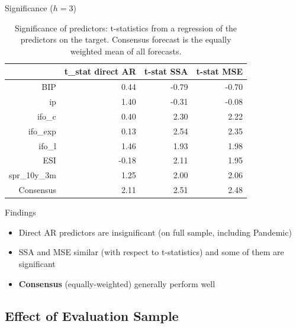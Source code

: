 \documentclass{beamer}
\begin{document}
\begin{frame} {Significance ($h=3$)}\label{tstat1}


\begin{table}[ht]
\centering
\begin{tabular}{rrrr}
  \hline
 & t\_stat direct AR & t-stat SSA & t-stat MSE \\ 
  \hline
BIP & 0.44 & -0.79 & -0.70 \\ 
  ip & 1.40 & -0.31 & -0.08 \\ 
  ifo\_c & 0.40 & 2.30 & 2.22 \\ 
  ifo\_exp & 0.13 & 2.54 & 2.35 \\ 
  ifo\_l & 1.46 & 1.93 & 1.98 \\ 
  ESI & -0.18 & 2.11 & 1.95 \\ 
  spr\_10y\_3m & 1.25 & 2.00 & 2.06 \\ 
  Consensus & 2.11 & 2.51 & 2.48 \\ 
   \hline
\end{tabular}
\caption{Significance of predictors: t-statistics from a regression of the predictors on the target. Consensus forecast is the equally weighted mean of all forecasts.} 
\label{perf_var1}
\end{table}\end{frame}


\begin{frame} {Findings}
\begin{itemize}
\item Direct AR predictors are insignificant (on full sample, including Pandemic)
\item SSA and MSE similar (with respect to t-statistics) and some of them are significant
\item \textbf{Consensus} (equally-weighted) generally perform well
\end{itemize}
\end{frame}







\subsection{Effect of Evaluation Sample}
\end{document}
